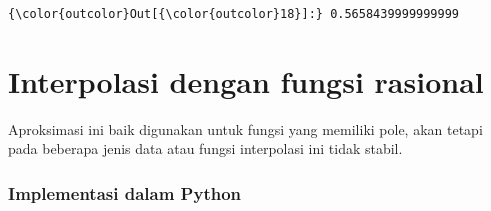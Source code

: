 \documentclass[11pt]{article}
\begin{document}
\begin{Verbatim}[commandchars=\\\{\}]
{\color{outcolor}Out[{\color{outcolor}18}]:} 0.5658439999999999
\end{Verbatim}
            
    \hypertarget{interpolasi-dengan-fungsi-rasional}{%
\section{Interpolasi dengan fungsi
rasional}\label{interpolasi-dengan-fungsi-rasional}}

    Aproksimasi ini baik digunakan untuk fungsi yang memiliki pole, akan
tetapi pada beberapa jenis data atau fungsi interpolasi ini tidak
stabil.

    \hypertarget{implementasi-dalam-python}{%
\subsubsection{Implementasi dalam
Python}\label{implementasi-dalam-python}}
\end{document}
